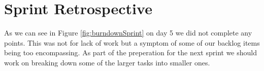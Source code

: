 \section{Sprint Retrospective}

As we can see in Figure \ref{fig:burndownSprint} on day 5 we did not complete
any points. This was not for lack of work but a symptom of some of our backlog
items being too encompassing. As part of the preperation for the next sprint we
should work on breaking down some of the larger tasks into smaller ones.